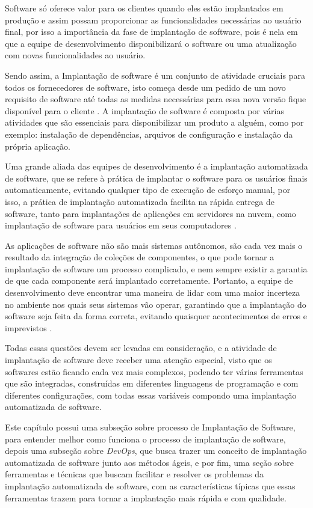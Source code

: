 Software só oferece valor para os clientes quando eles estão implantados em produção
e assim possam proporcionar as funcionalidades necessárias ao usuário final,
por isso a importância da fase de implantação de software, pois é nela em que a equipe
de desenvolvimento disponibilizará o software ou uma atualização com novas funcionalidades
ao usuário. 

Sendo assim, a Implantação de software é um conjunto de atividade cruciais
para todos os fornecedores de software, isto começa desde um pedido de um novo requisito
de software até todas as medidas necessárias para essa nova versão fique disponível
para o cliente \cite{5741269}. A implantação de software é composta por várias
atividades que são essenciais para disponibilizar um produto a alguém, como por exemplo:
instalação de dependências, arquivos de configuração e instalação da própria aplicação.

Uma grande aliada das equipes de desenvolvimento é a implantação automatizada de
software, que se refere à prática de implantar o software para os usuários finais
automaticamente, evitando qualquer tipo de execução de esforço manual, por isso,
a prática de implantação automatizada facilita na rápida entrega de software, tanto
para implantações de aplicações em servidores na nuvem, como implantação de software
para usuários em seus computadores \cite{7284592}.

As aplicações de software não são mais sistemas autônomos, 
são cada vez mais o resultado da integração de coleções de
componentes, o que pode tornar a implantação de software um processo complicado, e
nem sempre existir a garantia de que cada componente será implantado corretamente.
Portanto, a equipe de desenvolvimento deve encontrar uma maneira de lidar
com uma maior incerteza no ambiente nos quais seus sistemas vão operar, garantindo
que a implantação do software seja feita da forma correta, evitando quaisquer acontecimentos
de erros e imprevistos \cite{deployment1998}.

Todas essas questões devem ser levadas em consideração, e a atividade de implantação de
software deve receber uma atenção especial, visto que os softwares estão ficando
cada vez mais complexos, podendo ter várias ferramentas que são integradas, construídas
em diferentes linguagens de programação e com diferentes configurações, com todas
essas variáveis compondo
uma implantação automatizada de software. 

Este capítulo possui uma subseção sobre
processo de Implantação de Software, para entender melhor como funciona o processo
de implantação
de software, depois uma subseção sobre \textit{DevOps}, que busca trazer um conceito de implantação
automatizada de software junto aos métodos ágeis, e por fim, uma seção sobre
ferramentas e técnicas que buscam facilitar e resolver os problemas da
implantação automatizada de software, com as características típicas que essas
ferramentas trazem para tornar a implantação mais rápida e com qualidade.

